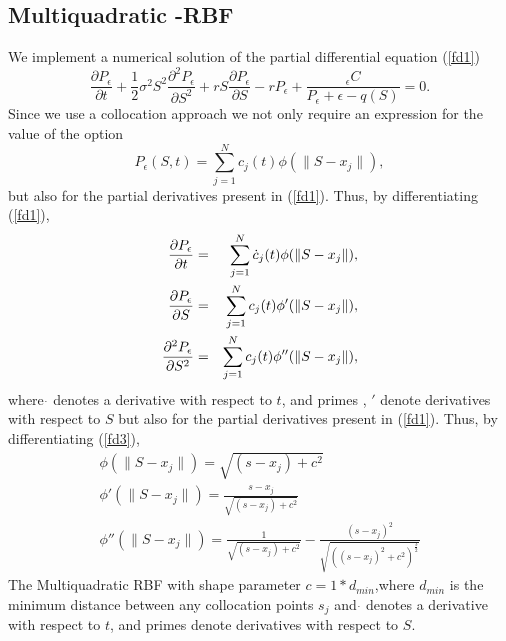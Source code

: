 \documentclass[12pt]{article}
\numberwithin{equation}{subsection} %
\begin{document}
\subsection{Multiquadratic -RBF}


We implement a numerical solution of the partial differential
equation (\ref{fd1})
$$
\frac{\partial P_\epsilon}{\partial
t}+\frac{1}{2}\sigma^2S^2\frac{\partial^2 P_\epsilon}{\partial S^2}
+rS\frac{\partial P_\epsilon}{\partial
S}-rP_\epsilon+\frac{_\epsilon C }{P_\epsilon + \epsilon - q(S)}=0.
$$
Since we use a collocation approach we not only require an
expression for the value of the option
\begin{equation}\label{fd3}
P_\epsilon (S,t) = \sum_{j=1}^N c_j(t) \phi(\|S-x_j\|),
\end{equation}
but also for the partial derivatives present in (\ref{fd1}). Thus,
by differentiating (\ref{fd1}),
\begin{eqnarray*}
\frac{\partial P_\epsilon}{\partial t} & = & \sum_{j=1}^N
\dot{c}_j(t) \phi(\|S-x_j\|), \cr \frac{\partial
P_\epsilon}{\partial S} & = & \sum_{j=1}^N c_j(t) \phi'(\|S-x_j\|),
\cr \frac{\partial^{2} P_\epsilon}{\partial S^{2}} & = &
\sum_{j=1}^N c_j(t) \phi''(\|S-x_j\|),
\end{eqnarray*}
where $\dot{}$ denotes a derivative with respect to $t$, and primes
, $'$ denote derivatives with respect to $S$ but also for the
partial derivatives present in (\ref{fd1}). Thus, by differentiating
(\ref{fd3}),
\begin{eqnarray*}
\phi(\|S-x_j\|)= \sqrt{(s-x_j)+c^2}\\
\phi'(\|S-x_j\|)=\frac{s-x_j}{\sqrt{(s-x_j)+c^2}}\\
\phi''(\|S-x_j\|)=\frac{1}{\sqrt{(s-x_j)+c^2}}-\frac{(s-x_j)^2}{\sqrt{((s-x_j)^2+c^2)^\frac{3}{2}}}
\end{eqnarray*}
The Multiquadratic RBF with shape parameter $c=1*d_{min}$,where
$d_{min}$ is the minimum distance between any collocation points
$s_j$ and $\dot{}$ denotes a derivative with respect to $t$, and
primes denote derivatives with respect to $S$.
\end{document}

